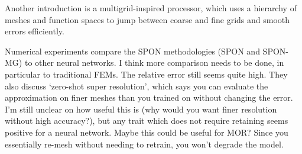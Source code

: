 \documentclass{article}
\begin{document}
Another introduction is a multigrid-inspired processor, which uses a hierarchy of meshes and function spaces to jump between coarse and fine grids and smooth errors efficiently. \newline

Numerical experiments compare the SPON methodologies (SPON and SPON-MG) to other neural networks. I think more comparison needs to be done, in particular to traditional FEMs. The relative error still seems quite high. They also discuss `zero-shot super resolution', which says you can evaluate the approximation on finer meshes than you trained on without changing the error. I'm still unclear on how useful this is (why would you want finer resolution without high accuracy?), but any trait which does not require retaining seems positive for a neural network. Maybe this could be useful for MOR? Since you essentially re-mesh without needing to retrain, you won't degrade the model.

\newpage

\begin{singlespace}

\end{singlespace}
\end{document}

